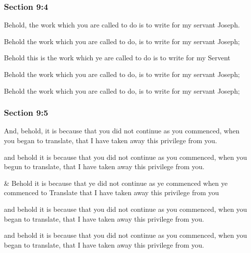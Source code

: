 	\subsubsection{Section 9:4} %
		\label{DC9-4}

		Behold, the work which you are called to do is to write for my servant Joseph.

		\begin{framed}
		\scriptsize
			\begin{compactdesc}
				\item[JSP] Behold the work which you are called to do, is to write for my servant Joseph;
				\item[RB1] Behold this is the work which ye are called to do is to write for my Servent 
				\item[DC 1835] Behold the work which you are called to do, is to write for my servant Joseph; 
				\item[DC 1844] Behold the work which you are called to do, is to write for my servant Joseph;
			\end{compactdesc}
		\end{framed}

	\subsubsection{Section 9:5} %
		\label{DC9-5}

		And, behold, it is because that you did not continue as you commenced, when you began to translate, that I have taken away this privilege from you.

		\begin{framed}
		\scriptsize
			\begin{compactdesc}
				\item[JSP] and behold it is because that you did not continue as you commenced, when you begun to translate, that I have taken away this privilege from you.
				\item[RB1] \& Behold it is because that ye did not continue as ye commenced when ye commenced to Translate that I have taken away this privilege from you
				\item[DC 1835] and behold it is because that you did not continue as you commenced, when you began to translate, that I have taken away this privilege from you.
				\item[DC 1844] and behold it is because that you did not continue as you commenced, when you began to translate, that I have taken away this privilege from you.
			\end{compactdesc}
		\end{framed}

